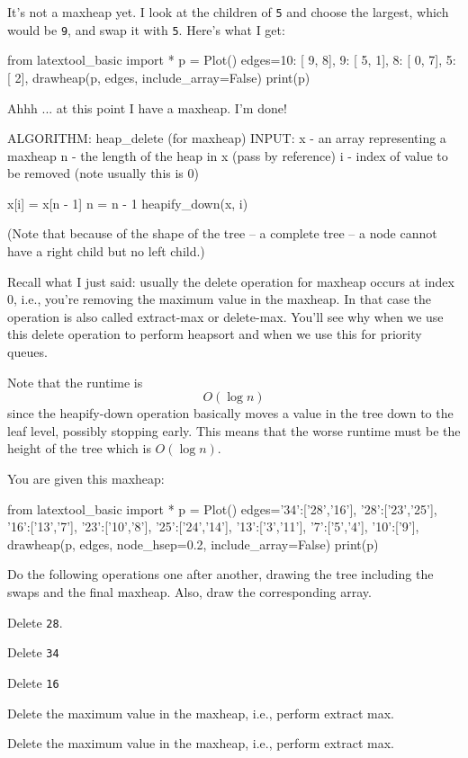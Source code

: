 It's not a maxheap yet.
I look at the children of \texttt{5} and choose the largest,
which would be \texttt{9}, and swap it with \texttt{5}.
Here's what I get:

\begin{python}
from latextool_basic import *
p = Plot()
edges={10: [ 9, 8],
        9: [ 5, 1],
        8: [ 0, 7],
        5: [ 2],
      }
drawheap(p, edges, include_array=False)
print(p)
\end{python}

Ahhh ... at this point I have a maxheap.
I'm done!

\begin{console}[commandchars=\\\{\}]
ALGORITHM: heap_delete (for maxheap)
INPUT: x - an array representing a maxheap
       n - the length of the heap in x (pass by reference)
       i - index of value to be removed (note usually
           this is 0)

x[i] = x[n - 1]
n = n - 1
heapify_down(x, i)
\end{console}

(Note that because of the shape of the tree -- a complete tree --
a node cannot have a right child but no left child.)

Recall what I just said: usually the delete operation for maxheap
occurs at index 0, i.e., you're removing the maximum value in the maxheap.
In that case the operation is also called extract-max or delete-max.
You'll see why when we use this delete operation to perform heapsort
and when we use this for priority queues.

Note that the runtime is
\[
O(\log n)
\]
since the heapify-down operation basically moves
a value in the tree down to the leaf level, possibly stopping
early.
This means that the worse runtime must be
the height of the tree which is $O(\log n)$.

\newpage
\begin{ex}
You are given this maxheap:

\begin{python}
from latextool_basic import *
p = Plot()
edges={'34':['28','16'],
       '28':['23','25'],
       '16':['13','7'],
       '23':['10','8'],
       '25':['24','14'],
       '13':['3','11'],
       '7':['5','4'],
       '10':['9'],
       }
drawheap(p, edges, node_hsep=0.2,
       include_array=False)
print(p)
\end{python}

Do the following operations one after another,
drawing the tree including the swaps
and the final
maxheap.
Also, draw the corresponding array.
\begin{tightlist}
  \item Delete \texttt{28}.
  \item Delete \texttt{34}
  \item Delete \texttt{16}
  \item Delete the maximum value in the maxheap, i.e., perform extract max.
  \item Delete the maximum value in the maxheap, i.e., perform extract max.
\end{tightlist}
\end{ex}

